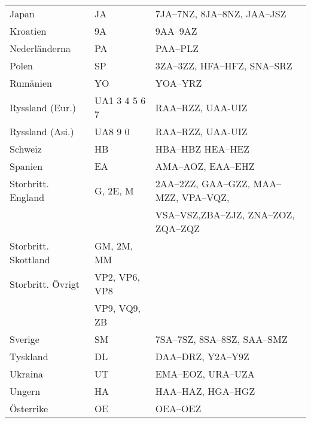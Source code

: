 \begin{center}
\begin{footnotesize}
\begin{longtable}{lll}
			Japan                         & JA             & 7JA--7NZ, 8JA--8NZ, JAA--JSZ                      \\
			Kroatien                      & 9A             & 9AA--9AZ                                          \\
			Nederländerna                 & PA             & PAA--PLZ                                          \\
			Polen                         & SP             & 3ZA--3ZZ, HFA--HFZ, SNA--SRZ                      \\
			Rumänien                      & YO             & YOA--YRZ                                          \\
			Ryssland (Eur.)               & UA1 3 4 5 6 7  & RAA--RZZ, UAA-UIZ                                 \\
			Ryssland (Asi.)               & UA8 9 0        & RAA--RZZ, UAA-UIZ                                 \\
			Schweiz                       & HB             & HBA--HBZ HEA--HEZ                                 \\
			Spanien                       & EA             & AMA--AOZ, EAA--EHZ                                \\
			Storbritt. England            & G, 2E, M       & 2AA--2ZZ, GAA--GZZ, MAA--MZZ, VPA--VQZ,           \\
			                              &                & VSA--VSZ,ZBA--ZJZ, ZNA--ZOZ, ZQA--ZQZ             \\
			Storbritt. Skottland          & GM, 2M, MM     &                                                   \\
			Storbritt. Övrigt             & VP2, VP6, VP8  &                                                   \\
			                              & VP9, VQ9, ZB   &                                                   \\
			Sverige                       & SM             & 7SA--7SZ, 8SA--8SZ, SAA--SMZ                      \\
			Tyskland                      & DL             & DAA--DRZ, Y2A--Y9Z                                \\
			Ukraina                       & UT             & EMA--EOZ, URA--UZA                                \\
			Ungern                        & HA             & HAA--HAZ, HGA--HGZ                                \\
			Österrike                     & OE             & OEA--OEZ\\
		\end{longtable}
	\end{footnotesize}
\end{center}

